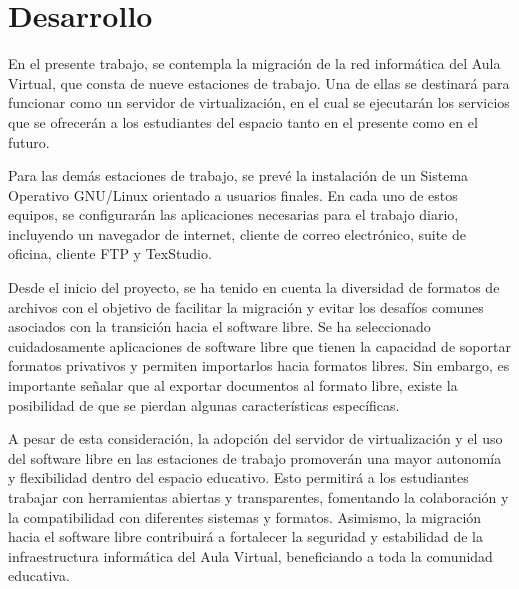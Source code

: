 \chapter{Desarrollo}\label{ch:desarrollo}
	
	
	En el presente trabajo, se contempla la migración de la red informática del Aula Virtual, que consta de nueve estaciones de trabajo. Una de ellas se destinará para funcionar como un servidor de virtualización, en el cual se ejecutarán los servicios que se ofrecerán a los estudiantes del espacio tanto en el presente como en el futuro.\par
	
	Para las demás estaciones de trabajo, se prevé la instalación de un Sistema Operativo GNU/Linux orientado a usuarios finales. En cada uno de estos equipos, se configurarán las aplicaciones necesarias para el trabajo diario, incluyendo un navegador de internet, cliente de correo electrónico, suite de oficina, cliente FTP y TexStudio.\par
	
	Desde el inicio del proyecto, se ha tenido en cuenta la diversidad de formatos de archivos con el objetivo de facilitar la migración y evitar los desafíos comunes asociados con la transición hacia el software libre. Se ha seleccionado cuidadosamente aplicaciones de software libre que tienen la capacidad de soportar formatos privativos y permiten importarlos hacia formatos libres. Sin embargo, es importante señalar que al exportar documentos al formato libre, existe la posibilidad de que se pierdan algunas características específicas.\par
	
	A pesar de esta consideración, la adopción del servidor de virtualización y el uso del software libre en las estaciones de trabajo promoverán una mayor autonomía y flexibilidad dentro del espacio educativo. Esto permitirá a los estudiantes trabajar con herramientas abiertas y transparentes, fomentando la colaboración y la compatibilidad con diferentes sistemas y formatos. Asimismo, la migración hacia el software libre contribuirá a fortalecer la seguridad y estabilidad de la infraestructura informática del Aula Virtual, beneficiando a toda la comunidad educativa.\par
